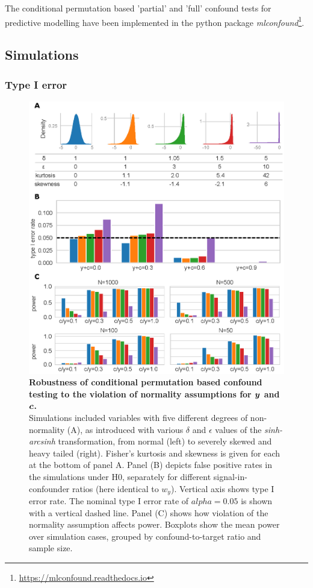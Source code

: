 \documentclass{article}
\begin{document}
The conditional permutation based 'partial' and 'full' confound tests for predictive modelling have been implemented in the python package \emph{mlconfound}\footnote{\href{https://mlconfound.readthedocs.io}{https://mlconfound.readthedocs.io}}.

\subsection{Simulations}

\subsubsection*{Type I error}

\begin{figure}[!b]
  \centering

  \includegraphics[width=0.40\paperwidth]{fig/sim_non-norm.eps}
  \caption{\textbf{Robustness of conditional permutation based confound testing to the violation of normality assumptions for $\boldsymbol{y}$ and $\boldsymbol{c}$.} \\
  Simulations included variables with five different degrees of non-normality (A), as introduced with various $\delta$ and $\epsilon$ values of the \emph{sinh-arcsinh} transformation, from normal (left) to severely skewed and heavy tailed (right). Fisher's kurtosis and skewness is given for each at the bottom of panel A. Panel (B) depicts false positive rates in the simulations under H0, separately for different signal-in-confounder ratios (here identical to $w_{y}$).
  Vertical axis shows type I error rate. The nominal type I error rate of $alpha=0.05$ is shown with a vertical dashed line. Panel (C) shows how violation of the normality assumption affects power. Boxplots show the mean power over simulation cases, grouped by confound-to-target ratio and sample size.}
  \label{fig:sim-non-normal}
\end{figure}
\end{document}
